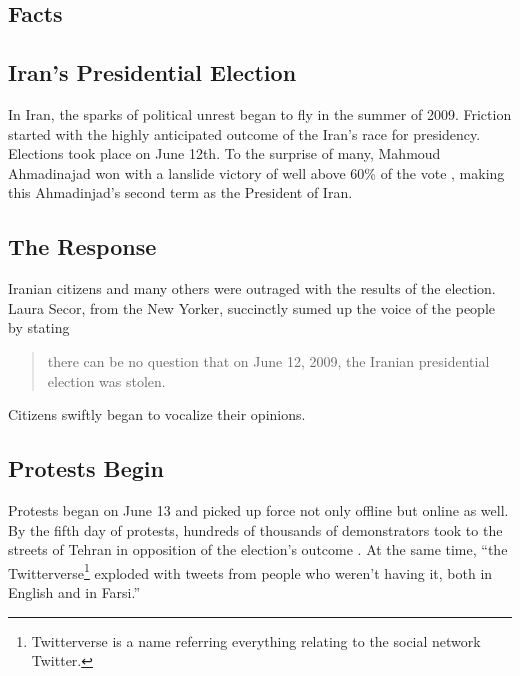 \documentclass[11pt]{article}
\begin{document}
\begin{multicols}{2}
\setcounter{page}{1}
\section{Facts} 

\subsection{Iran's Presidential Election}

In Iran, the sparks of political unrest began to fly in the summer of 2009.
Friction started with the highly anticipated outcome of the Iran's race for
presidency. Elections took place on June 12th. To the surprise of many, Mahmoud
Ahmadinajad won with a lanslide victory of well above 60\% of the vote
\cite{TheIranianVote, IranianElectionResultsByProvince}, making this
Ahmadinjad's second term as the President of Iran.

\subsection{The Response}

Iranian citizens and many others were outraged with the results of the election.
Laura Secor, from the New Yorker, succinctly sumed up the voice of the people by
stating \begin{quotation} there can be no question that on June 12, 2009, the Iranian
presidential election was stolen. \cite{TheIranianVote}\end{quotation} Citizens
swiftly began to vocalize their opinions.

\subsection{Protests Begin}

Protests began on June 13 and picked up force not only offline but online as
well. By the fifth day of protests, hundreds of thousands of demonstrators took to
the streets of Tehran in opposition of the election's outcome
\cite{IranProtestsFifthDayOfUnrest}. At the same time, ``the
Twitterverse\footnote{Twitterverse is a name referring everything relating to
the social network Twitter.} exploded with tweets from people who weren't having
it, both in English and in Farsi.'' \cite{WhyTwitterIsTheMedium}


\end{multicols}
\end{document}
